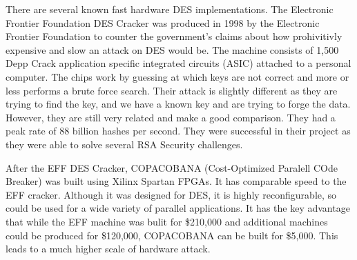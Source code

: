 There are several known fast hardware DES implementations.
The Electronic Frontier Foundation DES Cracker was produced in 1998 by the
Electronic Frontier Foundation to counter the government's claims about
how prohivitivly expensive and slow an attack on DES would be\cite{eff}.
The machine
consists of 1,500 Depp Crack application specific integrated circuits (ASIC)
attached to a personal computer.  The chips work by guessing at which keys are
not correct and more or less performs a brute force search.  Their attack
is slightly different as they are trying to find the key, and we have a known
key and are trying to forge the data.  However, they are still very related
and make a good comparison.  They had a peak rate of 88 billion hashes per 
second.  They were successful in their project as they were able to solve 
several RSA Security challenges.

After the EFF DES Cracker, COPACOBANA (Cost-Optimized Paralell COde Breaker)
was built using Xilinx Spartan FPGAs\cite{copacobana}.  
It has comparable speed to the EFF cracker.
Although it was designed for DES, it is highly reconfigurable, so could be
used for a wide variety of parallel applications.  It has the key advantage
that while the EFF machine was bulit for \$210,000 and additional machines
could be produced for \$120,000, COPACOBANA can be built for \$5,000.
This leads to a much higher scale of hardware attack. 

